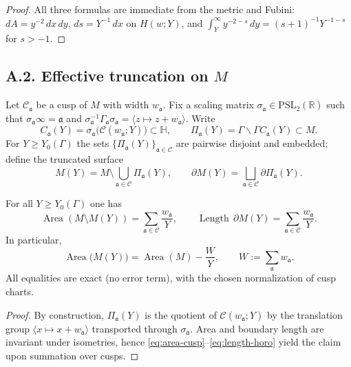 \begin{proof}
All three formulas are immediate from the metric and Fubini:
$dA=y^{-2}\,dx\,dy$, $ds=Y^{-1}\,dx$ on $H(w;Y)$, and
$\int_Y^\infty y^{-2-s}\,dy=(s+1)^{-1}Y^{-1-s}$ for $s>-1$.
\end{proof}

\subsection*{A.2. Effective truncation on $M$}

\noindent
Let $\mathcal C_{\mathfrak a}$ be a cusp of $M$ with width $w_{\mathfrak a}$.
Fix a scaling matrix $\sigma_{\mathfrak a}\in \mathrm{PSL}_2(\mathbb R)$ such that
$\sigma_{\mathfrak a}\infty=\mathfrak a$ and
$\sigma_{\mathfrak a}^{-1}\Gamma_{\mathfrak a}\sigma_{\mathfrak a}
=\langle z\mapsto z+w_{\mathfrak a}\rangle$. Write
\[
C_{\mathfrak a}(Y)=\sigma_{\mathfrak a}\big(\mathcal C(w_{\mathfrak a};Y)\big)
\subset \mathbb H,
\qquad
\Pi_{\mathfrak a}(Y)=\Gamma\backslash \Gamma C_{\mathfrak a}(Y)\subset M.
\]
For $Y\ge Y_0(\Gamma)$ the sets $\{\Pi_{\mathfrak a}(Y)\}_{\mathfrak a\in\mathcal C}$
are pairwise disjoint and embedded; define the truncated surface
\[
M(Y)= M\setminus \bigcup_{\mathfrak a\in\mathcal C}\Pi_{\mathfrak a}(Y),
\qquad
\partial M(Y)= \bigsqcup_{\mathfrak a\in\mathcal C} \partial\Pi_{\mathfrak a}(Y).
\]

\begin{proposition}\label{prop:vol-defect}
For all $Y\ge Y_0(\Gamma)$ one has
\begin{equation}\label{eq:vol-defect}
\operatorname{Area}\!\left(M\setminus M(Y)\right)
=\sum_{\mathfrak a\in\mathcal C}\frac{w_{\mathfrak a}}{Y},
\qquad
\operatorname{Length}\,\partial M(Y)=\sum_{\mathfrak a\in\mathcal C}\frac{w_{\mathfrak a}}{Y}.
\end{equation}
In particular,
\[
\operatorname{Area}\big(M(Y)\big)=\operatorname{Area}(M)-\frac{W}{Y},
\qquad
W:=\sum_{\mathfrak a} w_{\mathfrak a}.
\]
All equalities are exact (no error term), with the chosen normalization of cusp
charts.
\end{proposition}

\begin{proof}
By construction, $\Pi_{\mathfrak a}(Y)$ is the quotient of
$\mathcal C(w_{\mathfrak a};Y)$ by the translation group
$\langle x\mapsto x+w_{\mathfrak a}\rangle$ transported through $\sigma_{\mathfrak a}$.
Area and boundary length are invariant under isometries, hence
\eqref{eq:area-cusp}–\eqref{eq:length-horo} yield the claim upon summation over
cusps.
\end{proof}

